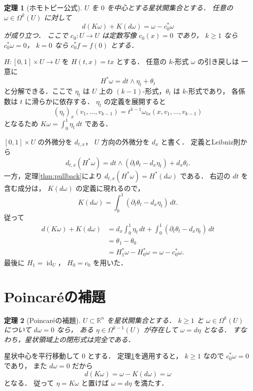 \documentclass[a5paper,10pt,onecolumn]{jsarticle}
\makeatletter
\theoremstyle{mathnotetheorem}
\newtheorem{theorem}{定理}[section]
\renewcommand{\proofname}{証明}
\renewenvironment{proof}[1][\proofname]{%
  \par\pushQED{\qed}\normalfont\topsep4\p@\@plus2\p@\relax
  \trivlist\item[\hskip\labelsep\bfseries #1]\ignorespaces
}{\popQED\endtrivlist\@endpefalse}
\makeatother
\begin{document}
\begin{theorem}[ホモトピー公式]\label{thm:homotopy-formula}
$U$ を $0$ を中心とする星状開集合とする．
任意の $\omega\in\Omega^k(U)$ に対して
\[
 d(K\omega)+K(d\omega)=\omega-c_0^*\omega
\]
が成り立つ．
ここで $c_0:U\to U$ は定数写像 $c_0(x)=0$ であり，
$k\ge1$ なら $c_0^*\omega=0$，
$k=0$ なら $c_0^*f=f(0)$ とする．
\end{theorem}
\begin{proof}
$H:[0,1]\times U\to U$ を
$H(t,x)=tx$ とする．
任意の $k$-形式 $\omega$ の引き戻しは
一意に
\[
 H^*\omega=dt\wedge\eta_t+\theta_t
\]
と分解できる．ここで $\eta_t$ は $U$ 上の
$(k-1)$-形式，$\theta_t$ は $k$-形式であり，
各係数は $t$ に滑らかに依存する．
$\eta_t$ の定義を展開すると
\[
 (\eta_t)_x(v_1,\dots,v_{k-1})
 =t^{k-1}\omega_{tx}(x,v_1,\dots,v_{k-1})
\]
となるため
$K\omega=\int_0^1\eta_t\,dt$ である．

$[0,1]\times U$ の外微分を $d_{t,x}$，
$U$ 方向の外微分を $d_x$ と書く．
定義とLeibniz則から
\[
 d_{t,x}(H^*\omega)
 =dt\wedge(\partial_t\theta_t-d_x\eta_t)
  +d_x\theta_t.
\]
一方，定理\ref{thm:pullback}により
$d_{t,x}(H^*\omega)=H^*(d\omega)$ である．
右辺の $dt$ を含む成分は，
$K(d\omega)$ の定義に現れるので，
\[
 K(d\omega)=\int_0^1(\partial_t\theta_t-d_x\eta_t)\,dt.
\]
従って
\begin{align*}
 d(K\omega)+K(d\omega)
 &=d_x\int_0^1\eta_t\,dt
   +\int_0^1(\partial_t\theta_t-d_x\eta_t)\,dt\\
 &=\theta_1-\theta_0\\
 &=H_1^*\omega-H_0^*\omega
 =\omega-c_0^*\omega.
\end{align*}
最後に $H_1=\operatorname{id}_U$，
$H_0=c_0$ を用いた．
\end{proof}

\section{Poincar\'eの補題}

\begin{theorem}[Poincar\'eの補題]\label{thm:poincare}
$U\subset\mathbb R^n$ を星状開集合とする．
$k\ge1$ と $\omega\in\Omega^k(U)$ について
$d\omega=0$ なら，
ある $\eta\in\Omega^{k-1}(U)$ が存在して
$\omega=d\eta$ となる．
すなわち，星状領域上の閉形式は完全である．
\end{theorem}
\begin{proof}
星状中心を平行移動して $0$ とする．
定理\ref{thm:homotopy-formula}を適用すると，
$k\ge1$ なので $c_0^*\omega=0$ であり，
また $d\omega=0$ だから
\[
 d(K\omega)=\omega-K(d\omega)=\omega
\]
となる．
従って $\eta=K\omega$ と置けば
$\omega=d\eta$ を満たす．
\end{proof}
\end{document}
